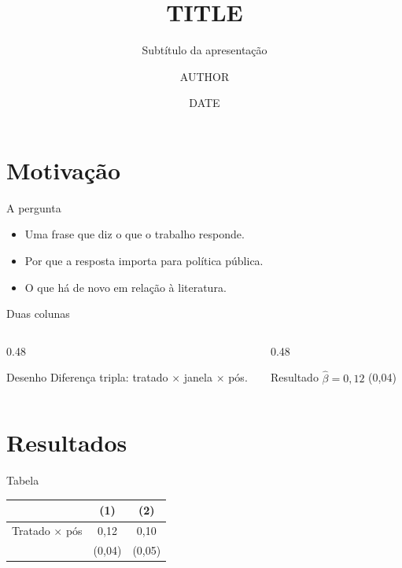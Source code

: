 \documentclass[aspectratio=169,11pt]{beamer}
\title{{{TITLE}}}
\subtitle{Subtítulo da apresentação}
\author{{{AUTHOR}}}
\institute{{{INSTITUTION}}}
\date{{{DATE}}}
\begin{document}
\begin{frame}[plain]
  \titlepage
\end{frame}

\section{Motivação}

\begin{frame}{A pergunta}
  \begin{itemize}
    \item Uma frase que diz o que o trabalho responde.
    \item Por que a resposta importa para política pública.
    \item \alert{O que há de novo} em relação à literatura.
  \end{itemize}
\end{frame}

\begin{frame}{Duas colunas}
  \begin{columns}[T]
    \begin{column}{0.48\textwidth}
      \begin{block}{Desenho}
        Diferença tripla: tratado $\times$ janela $\times$ pós.
      \end{block}
    \end{column}
    \begin{column}{0.48\textwidth}
      \begin{exampleblock}{Resultado}
        $\hat\beta = 0{,}12$ (0{,}04)
      \end{exampleblock}
    \end{column}
  \end{columns}
\end{frame}

\section{Resultados}

\begin{frame}{Tabela}
  \centering
  \begin{tabular}{lcc}
    \toprule
    & (1) & (2) \\
    \midrule
    Tratado $\times$ pós & 0{,}12 & 0{,}10 \\
                         & (0{,}04) & (0{,}05) \\
    \bottomrule
  \end{tabular}
\end{frame}
\end{document}
